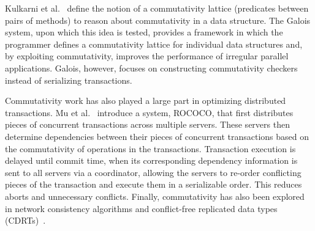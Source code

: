 Kulkarni et al.~\cite{galois} define the notion of a commutativity lattice (predicates between pairs of methods) to reason about commutativity in a data structure. The Galois system, upon which this idea is tested, provides a framework in which the programmer defines a commutativity lattice for individual data structures and, by exploiting commutativity, improves the performance of irregular parallel applications. Galois, however, focuses on constructing commutativity checkers instead of serializing transactions.

Commutativity work has also played a large part in optimizing distributed transactions. Mu et al.~\cite{distributed} introduce a system, ROCOCO, that first distributes pieces of concurrent transactions across multiple servers. These servers then determine dependencies between their pieces of concurrent transactions based on the commutativity of operations in the transactions.
 Transaction execution is delayed until commit time, when its corresponding dependency information is sent to all servers via a coordinator, allowing the servers to re-order conflicting pieces of the transaction and execute them in a serializable order. This reduces aborts and unnecessary conflicts.
Finally, commutativity has also been explored in network consistency algorithms and conflict-free replicated data types (CDRTs)~\cite{CRDT}.
